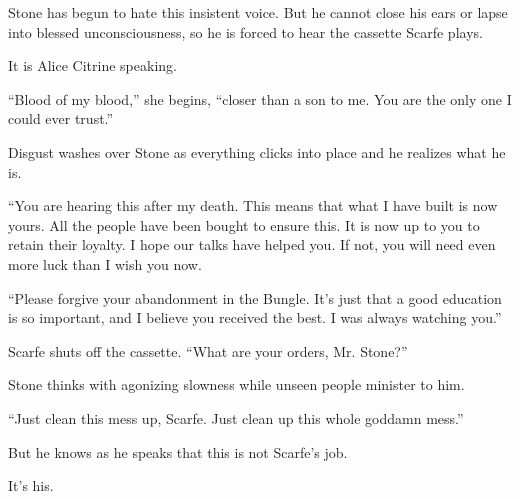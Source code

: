 Stone has begun to hate this insistent voice. But he cannot close his ears or lapse into blessed unconsciousness, so he is forced to hear the cassette Scarfe plays.

It is Alice Citrine speaking.

``Blood of my blood,'' she begins, ``closer than a son to me. You are the only one I could ever trust.''

Disgust washes over Stone as everything clicks into place and he realizes what he is.

``You are hearing this after my death. This means that what I have built is now yours. All the people have been bought to ensure this. It is now up to you to retain their loyalty. I hope our talks have helped you. If not, you will need even more luck than I wish you now.

``Please forgive your abandonment in the Bungle. It's just that a good education is so important, and I believe you received the best. I was always watching you.''

Scarfe shuts off the cassette. ``What are your orders, Mr. Stone?''

Stone thinks with agonizing slowness while unseen people minister to him.

``Just clean this mess up, Scarfe. Just clean up this whole goddamn mess.''

But he knows as he speaks that this is not Scarfe's job.

It's his.